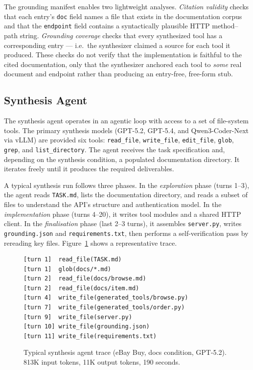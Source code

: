 \documentclass[12pt]{report}
\begin{document}
\noindent
The grounding manifest enables two lightweight analyses. \emph{Citation
validity} checks that each entry's \texttt{doc} field names a file that
exists in the documentation corpus and that the \texttt{endpoint} field
contains a syntactically plausible HTTP method--path string. \emph{Grounding
coverage} checks that every synthesized tool has a corresponding entry ---
i.e.\ the synthesizer claimed a source for each tool it produced. These
checks do not verify that the implementation is faithful to the cited
documentation, only that the synthesizer anchored each tool to \emph{some}
real document and endpoint rather than producing an entry-free, free-form
stub.

\subsection{Synthesis Agent}

The synthesis agent operates in an agentic loop with access to a set of
file-system tools. The primary synthesis models (GPT-5.2, GPT-5.4, and
Qwen3-Coder-Next via vLLM) are provided six tools: \texttt{read\_file},
\texttt{write\_file}, \texttt{edit\_file}, \texttt{glob}, \texttt{grep},
and \texttt{list\_directory}. The agent receives the task specification and,
depending on the synthesis condition, a populated documentation directory.
It iterates freely until it produces the required deliverables.

A typical synthesis run follows three phases. In the \emph{exploration} phase
(turns 1--3), the agent reads \texttt{TASK.md}, lists the documentation
directory, and reads a subset of files to understand the API's structure and
authentication model. In the \emph{implementation} phase (turns 4--20), it
writes tool modules and a shared HTTP client. In the \emph{finalisation}
phase (last 2--3 turns), it assembles \texttt{server.py}, writes
\texttt{grounding.json} and \texttt{requirements.txt}, then performs a
self-verification pass by rereading key files. Figure~\ref{fig:synth-trace}
shows a representative trace.

\begin{figure}[h]
\centering
\small
\begin{verbatim}
[turn 1]  read_file(TASK.md)
[turn 1]  glob(docs/*.md)
[turn 2]  read_file(docs/browse.md)
[turn 2]  read_file(docs/item.md)
[turn 4]  write_file(generated_tools/browse.py)
[turn 7]  write_file(generated_tools/order.py)
[turn 9]  write_file(server.py)
[turn 10] write_file(grounding.json)
[turn 11] write_file(requirements.txt)
\end{verbatim}
\caption{Typical synthesis agent trace (eBay Buy, docs condition, GPT-5.2).
813K input tokens, 11K output tokens, 190 seconds.}
\label{fig:synth-trace}
\end{figure}
\end{document}
